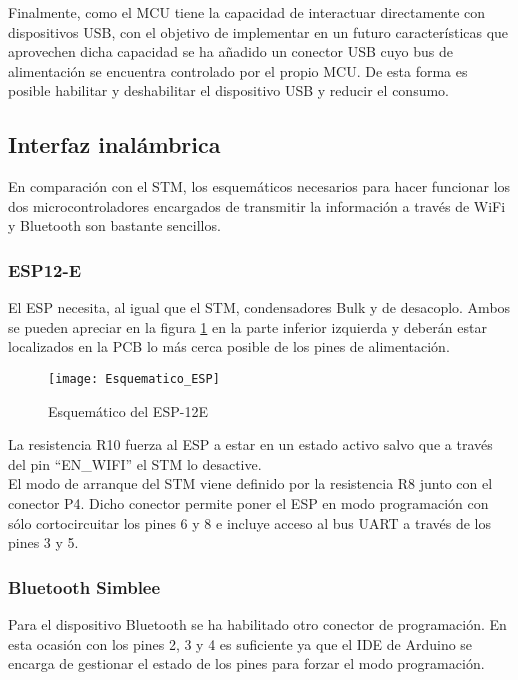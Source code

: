 Finalmente, como el \acrshort{MCU} tiene la capacidad de interactuar directamente con dispositivos \acrshort{USB}, con el objetivo de implementar en un futuro características que aprovechen dicha capacidad se ha añadido un conector \acrshort{USB} cuyo bus de alimentación se encuentra controlado por el propio \acrshort{MCU}. De esta forma es posible habilitar y deshabilitar el dispositivo USB y reducir el consumo.

\subsection{Interfaz inalámbrica\label{sec:Esquematico_inalambrica}}

En comparación con el STM, los esquemáticos necesarios para hacer funcionar los dos microcontroladores encargados de transmitir la información a través de WiFi y Bluetooth son bastante sencillos.

\subsubsection{ESP12-E\label{sec:Esquematico_ESP}}

El ESP necesita, al igual que el STM, condensadores Bulk y de desacoplo. Ambos se pueden apreciar en la figura \ref{fig:Esquematico_ESP} en la parte inferior izquierda y deberán estar localizados en la \acrshort{PCB} lo más cerca posible de los pines de alimentación.

\begin{figure} [h]
    \centering
    \texttt{[image: Esquematico\_ESP]}
    \caption{Esquemático del ESP-12E}
    \label{fig:Esquematico_ESP}
\end{figure}

La resistencia R10 fuerza al ESP a estar en un estado activo salvo que a través del pin ``EN\_WIFI'' el STM lo desactive. 
\\El modo de arranque del STM viene definido por la resistencia R8 junto con el conector P4. Dicho conector permite poner el ESP en modo programación con sólo cortocircuitar los pines 6 y 8 e incluye acceso al bus UART a través de los pines 3 y 5.

\subsubsection{Bluetooth Simblee\label{sec:Esquematico_BT}}

Para el dispositivo Bluetooth se ha habilitado otro conector de programación. En esta ocasión con los pines 2, 3 y 4 es suficiente ya que el \acrshort{IDE} de Arduino se encarga de gestionar el estado de los pines para forzar el modo programación.

